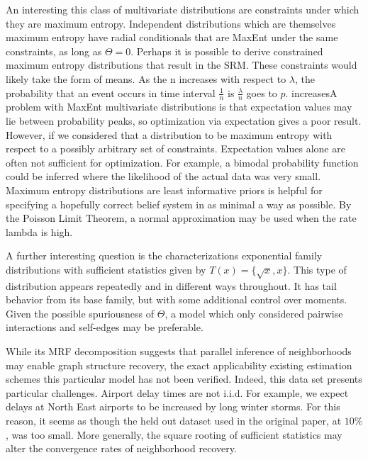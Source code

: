 \documentclass{samkoelleprelimworking}
\begin{document}
An interesting this class of multivariate distributions are constraints under which they are maximum entropy.  Independent distributions which are themselves maximum entropy have radial conditionals that are MaxEnt under the same constraints, as long as $\Theta = 0$.  Perhaps it is possible to derive constrained maximum entropy distributions that result in the SRM.  These constraints would likely take the form of means.  As the n increases with respect to $\lambda$, the probability that an event occurs in time interval $\frac{1}{n}$ is $\frac{\lambda}{n}$ goes to $p$.   increasesA problem with MaxEnt multivariate distributions is that expectation values may lie between probability peaks, so optimization via expectation gives a poor result.  However, if we considered that a distribution to be maximum entropy with respect to a possibly arbitrary set of constraints.  Expectation values alone are often not sufficient for optimization.  For example, a bimodal probability function could be inferred where the likelihood of the actual data was very small.  Maximum entropy distributions are least informative priors is helpful for specifying a hopefully correct belief system in as minimal a way as possible.   By the Poisson Limit Theorem, a normal approximation may be used when the rate lambda is high.

A further interesting question is the characterizations exponential family distributions with sufficient statistics given by $T(x) = \{ \sqrt{x}, x \}$.  This type of distribution appears repeatedly and in different ways throughout.  It has tail behavior from its base family, but with some additional control over moments.  Given the possible spuriousness of $\Theta$, a model which only considered pairwise interactions and self-edges may be preferable.

While its MRF decomposition suggests that parallel inference of neighborhoods may enable graph structure recovery, the exact applicability existing estimation schemes this particular model has not been verified.  Indeed, this data set presents particular challenges.  Airport delay times are not i.i.d.  For example, we expect delays at North East airports to be increased by long winter storms.  For this reason, it seems as though the held out dataset used in the original paper, at $10\%$, was too small.  More generally, the square rooting of sufficient statistics may alter the convergence rates of neighborhood recovery.
 
\end{document}

